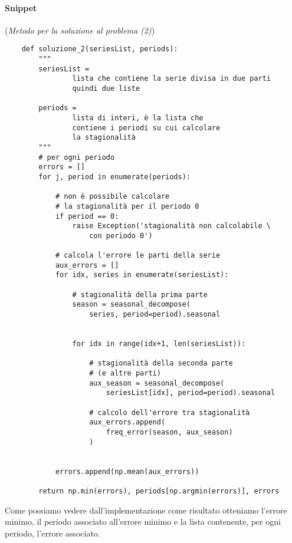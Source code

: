 \paragraph*{Snippet} (\textit{Metodo per la soluzione al problema (2)})
\begin{verbatim}
    def soluzione_2(seriesList, periods):
        """ 
        seriesList = 
                lista che contiene la serie divisa in due parti
                quindi due liste

        periods = 
                lista di interi, è la lista che
                contiene i periodi su cui calcolare
                la stagionalità
        """
        # per ogni periodo
        errors = []
        for j, period in enumerate(periods):

            # non è possibile calcolare 
            # la stagionalità per il periodo 0
            if period == 0:
                raise Exception('stagionalità non calcolabile \
                    con periodo 0')

            # calcola l'errore le parti della serie
            aux_errors = []
            for idx, series in enumerate(seriesList):

                # stagionalità della prima parte
                season = seasonal_decompose(
                    series, period=period).seasonal

                
                for idx in range(idx+1, len(seriesList)):

                    # stagionalità della seconda parte 
                    # (e altre parti)
                    aux_season = seasonal_decompose(
                        seriesList[idx], period=period).seasonal
                    
                    # calcolo dell'errore tra stagionalità
                    aux_errors.append(
                        freq_error(season, aux_season)
                    )
            

            errors.append(np.mean(aux_errors))

        return np.min(errors), periods[np.argmin(errors)], errors
\end{verbatim}

Come possiamo vedere dall'implementazione come risultato otteniamo l'errore minimo, il periodo
associato all'errore minimo e la lista contenente, per ogni periodo, l'errore associato.

